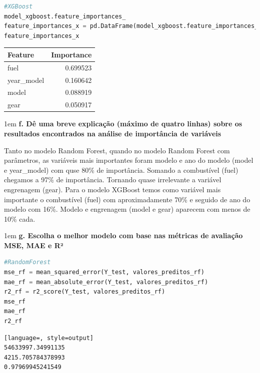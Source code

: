 \begin{lstlisting}[language=Python, style=input]
#XGBoost
model_xgboost.feature_importances_
feature_importances_x = pd.DataFrame(model_xgboost.feature_importances_, index = X_train.columns, columns=['importance']).sort_values('importance', ascending = False)
feature_importances_x
\end{lstlisting}
\begin{table}[H]
\centering
\begin{tcolorbox}[myoutputstyle]
\begin{tabular}{lr}
\hline
\textbf{Feature} & \textbf{Importance} \\
\hline
fuel        & 0.699523 \\
year\_model & 0.160642 \\
model       & 0.088919 \\
gear        & 0.050917 \\
\hline
\end{tabular}
\end{tcolorbox}
\end{table}



\begin{adjustwidth}{1em}{}
\textbf{f. Dê uma breve explicação (máximo de quatro linhas) sobre os resultados encontrados na análise de importância de
variáveis}
\end{adjustwidth}

Tanto no modelo Random Forest, quando no modelo Random Forest com parâmetros, as variáveis mais importantes foram modelo e ano do modelo (model e year\_model) com quse 80\% de importância. Somando a combustível (fuel) chegamos a 97\% de importância. Tornando quase irrelevante a variável engrenagem (gear). Para o modelo XGBoost temos como variável mais importante o combustível (fuel) com aproximadamente 70\% e seguido de ano do modelo com 16\%. Modelo e engrenagem (model e gear) aparecem com menos de 10\% cada.

\begin{adjustwidth}{1em}{}
\textbf{g. Escolha o melhor modelo com base nas métricas de avaliação MSE, MAE e R²}
\end{adjustwidth}
\begin{lstlisting}[language=Python, style=input]
#RandomForest
mse_rf = mean_squared_error(Y_test, valores_preditos_rf)
mae_rf = mean_absolute_error(Y_test, valores_preditos_rf)
r2_rf = r2_score(Y_test, valores_preditos_rf)
mse_rf
mae_rf
r2_rf
\end{lstlisting}
\begin{lstlisting}[language=, style=output]
54633997.34991135
4215.705784378993
0.97969945241549
\end{lstlisting}


